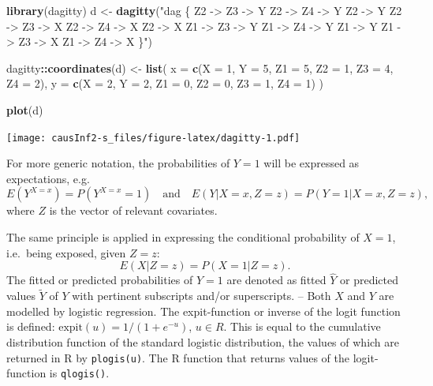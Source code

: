 \documentclass[
]{book}
\newenvironment{Shaded}{\begin{snugshade}}{\end{snugshade}}
\newcommand{\AttributeTok}[1]{\textcolor[rgb]{0.13,0.29,0.53}{#1}}
\newcommand{\DecValTok}[1]{\textcolor[rgb]{0.00,0.00,0.81}{#1}}
\newcommand{\FunctionTok}[1]{\textcolor[rgb]{0.13,0.29,0.53}{\textbf{#1}}}
\newcommand{\NormalTok}[1]{#1}
\newcommand{\OtherTok}[1]{\textcolor[rgb]{0.56,0.35,0.01}{#1}}
\newcommand{\SpecialCharTok}[1]{\textcolor[rgb]{0.81,0.36,0.00}{\textbf{#1}}}
\newcommand{\StringTok}[1]{\textcolor[rgb]{0.31,0.60,0.02}{#1}}
\begin{document}
\begin{Shaded}
\begin{Highlighting}[]
\FunctionTok{library}\NormalTok{(dagitty)}
\NormalTok{d }\OtherTok{\textless{}{-}}
  \FunctionTok{dagitty}\NormalTok{(}\StringTok{"dag \{}
\StringTok{  Z2 {-}\textgreater{} Z3 {-}\textgreater{} Y}
\StringTok{  Z2 {-}\textgreater{} Z4 {-}\textgreater{} Y}
\StringTok{  Z2 {-}\textgreater{} Y}
\StringTok{  Z2 {-}\textgreater{} Z3 {-}\textgreater{} X}
\StringTok{  Z2 {-}\textgreater{} Z4 {-}\textgreater{} X}
\StringTok{  Z2 {-}\textgreater{} X}
\StringTok{  Z1 {-}\textgreater{} Z3 {-}\textgreater{} Y}
\StringTok{  Z1 {-}\textgreater{} Z4 {-}\textgreater{} Y}
\StringTok{  Z1 {-}\textgreater{} Y}
\StringTok{  Z1 {-}\textgreater{} Z3 {-}\textgreater{} X}
\StringTok{  Z1 {-}\textgreater{} Z4 {-}\textgreater{} X}
\StringTok{\}"}\NormalTok{)}

\NormalTok{dagitty}\SpecialCharTok{::}\FunctionTok{coordinates}\NormalTok{(d) }\OtherTok{\textless{}{-}}
  \FunctionTok{list}\NormalTok{(}
    \AttributeTok{x =} \FunctionTok{c}\NormalTok{(}\AttributeTok{X =} \DecValTok{1}\NormalTok{, }\AttributeTok{Y =} \DecValTok{5}\NormalTok{, }\AttributeTok{Z1 =} \DecValTok{5}\NormalTok{, }\AttributeTok{Z2 =} \DecValTok{1}\NormalTok{, }\AttributeTok{Z3 =} \DecValTok{4}\NormalTok{, }\AttributeTok{Z4 =} \DecValTok{2}\NormalTok{),}
    \AttributeTok{y =} \FunctionTok{c}\NormalTok{(}\AttributeTok{X =} \DecValTok{2}\NormalTok{, }\AttributeTok{Y =} \DecValTok{2}\NormalTok{, }\AttributeTok{Z1 =} \DecValTok{0}\NormalTok{, }\AttributeTok{Z2 =} \DecValTok{0}\NormalTok{, }\AttributeTok{Z3 =} \DecValTok{1}\NormalTok{, }\AttributeTok{Z4 =} \DecValTok{1}\NormalTok{)}
\NormalTok{  )}

\FunctionTok{plot}\NormalTok{(d)}
\end{Highlighting}
\end{Shaded}

\texttt{[image: causInf2-s\_files/figure-latex/dagitty-1.pdf]}

For more generic notation, the probabilities of \(Y=1\) will be expressed
as expectations, e.g.~
\[E(Y^{X=x}) = P(Y^{X=x}=1) \quad \text{and} \quad 
E(Y|X=x, Z=z) = P(Y=1|X=x, Z=z), \]
where \(Z\) is the vector of relevant
covariates.

The same principle is applied in expressing the conditional
probability of \(X=1\), i.e.~being exposed, given \(Z=z\):
\[ E(X|Z=z) = P(X=1|Z=z). \]
The fitted or predicted probabilities
of \(Y=1\) are denoted as fitted \(\widehat{Y}\) or predicted values
\(\widetilde{Y}\) of \(Y\) with pertinent subscripts and/or superscripts.
-- Both \(X\) and \(Y\) are modelled by logistic regression. The expit-function
or inverse of the logit function is defined:
\(\text{expit}(u) = 1/(1 + e^{-u})\), \(u\in R\). This is equal to the
cumulative distribution function of the standard logistic distribution,
the values of which are returned in R by \texttt{plogis(u)}. The R function
that returns values of the logit-function is \texttt{qlogis()}.
\end{document}
